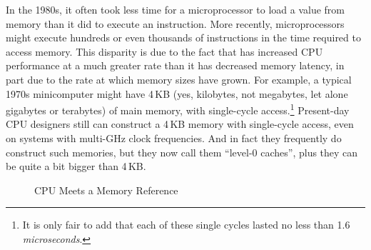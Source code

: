 In the 1980s, it often took less time for a microprocessor to load a value
from memory than it did to execute an instruction.
More recently, microprocessors might execute hundreds or even thousands
of instructions in the time required to access memory.
This disparity is due to the fact that  has increased CPU
performance at a much greater rate than it has decreased memory latency,
in part due to the rate at which memory sizes have grown.
For example, a typical 1970s minicomputer might have 4\,KB (yes, kilobytes,
not megabytes, let alone gigabytes or terabytes) of main memory, with
single-cycle access.\footnote{
	It is only fair to add that each of these single cycles
	lasted no less than 1.6 \emph{microseconds}.}
Present-day CPU designers still can construct a 4\,KB memory with single-cycle
access, even on systems with multi-GHz clock frequencies.
And in fact they frequently do construct such memories, but they now
call them ``level-0 caches'', plus they can be quite a bit bigger than 4\,KB.

\fi

\begin{figure}[htb]
\centering
{}
\caption{CPU Meets a Memory Reference}
\end{figure}

